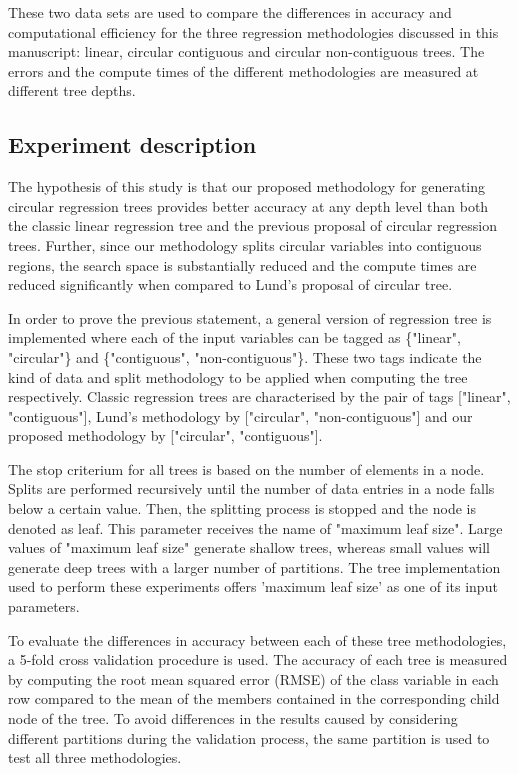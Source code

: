 \documentclass[times,twocolumn,final,authoryear]{elsarticle}
\begin{document}
These two data sets are used to compare the differences in accuracy and computational efficiency for the three regression methodologies discussed in this manuscript: linear, circular contiguous and circular non-contiguous trees. The errors and the compute times of the different methodologies are measured at different tree depths.

\subsection{Experiment description}

The hypothesis of this study is that our proposed methodology for generating circular regression trees provides better accuracy at any depth level than both the classic linear regression tree and the previous proposal of circular regression trees. Further, since our methodology splits circular variables into contiguous regions, the search space is substantially reduced and the compute times are reduced significantly when compared to Lund's proposal of circular tree.

In order to prove the previous statement, a general version of regression tree is implemented where each of the input variables can be tagged as \{"linear", "circular"\} and \{"contiguous", "non-contiguous"\}. These two tags indicate the kind of data and split methodology to be applied when computing the tree respectively. Classic regression trees are characterised by the pair of tags ["linear", "contiguous"], Lund's methodology by ["circular", "non-contiguous"] and our proposed methodology by ["circular", "contiguous"].

The stop criterium for all trees is based on the number of elements in a node. Splits are performed recursively until the number of data entries in a node falls below a certain value. Then, the splitting process is stopped and the node is denoted as leaf. This parameter receives the name of "maximum leaf size". Large values of "maximum leaf size" generate shallow trees, whereas small values will generate deep trees with a larger number of partitions. The tree implementation used to perform these experiments offers 'maximum leaf size' as one of its input parameters.

To evaluate the differences in accuracy between each of these tree methodologies, a 5-fold cross validation procedure is used. The accuracy of each tree is measured by computing the root mean squared error (RMSE) of the class variable in each row compared to the mean of the members contained in the corresponding child node of the tree. To avoid differences in the results caused by considering different partitions during the validation process, the same partition is used to test all three methodologies.
\end{document}
